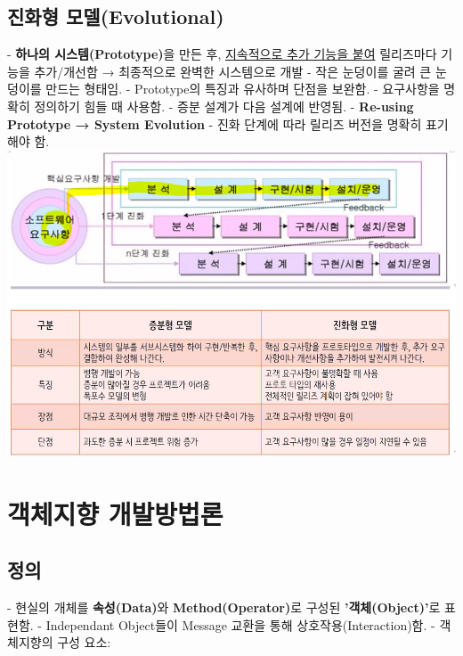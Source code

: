 \documentclass[a4paper,12pt]{article}
\begin{document}
\subsection{진화형 모델(Evolutional)}
- \textbf{하나의 시스템(Prototype)}을 만든 후, \underline{지속적으로 추가 기능을 붙여} 릴리즈마다 기능을 추가/개선함 → 최종적으로 완벽한 시스템으로 개발
\newline
- 작은 눈덩이를 굴려 큰 눈덩이를 만드는 형태임.
\newline
- Prototype의 특징과 유사하며 단점을 보완함.
\newline
- 요구사항을 명확히 정의하기 힘들 때 사용함.
\newline
- 증분 설계가 다음 설계에 반영됨.
\newline
- \textbf{Re-using Prototype → System Evolution}
\newline
- 진화 단계에 따라 릴리즈 버전을 명확히 표기해야 함.
\newline
\newline
\includegraphics[scale=0.75]{52}


\newpage
\section{객체지향 개발방법론}

\subsection{정의}
- 현실의 개체를 \textbf{속성(Data)}와 \textbf{Method(Operator)}로 구성된 \textbf{'객체(Object)'}로 표현함.
\newline
- Independant Object들이 Message 교환을 통해 상호작용(Interaction)함.
\newline
\newline
- 객체지향의 구성 요소:
\end{document}
